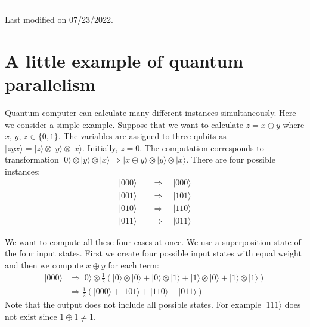 \documentclass[letterpaper,10pt,english]{jupyterBook}
\begin{document}
\bigskip\hrule\bigskip


\sphinxAtStartPar
Last modified on 07/23/2022.

\sphinxstepscope


\section{A little example of quantum parallelism}
\label{\detokenize{algorithms/qparallel:a-little-example-of-quantum-parallelism}}\label{\detokenize{algorithms/qparallel:sec-qparallel}}\label{\detokenize{algorithms/qparallel::doc}}
\sphinxAtStartPar
Quantum computer can calculate many different instances simultaneously. Here we consider a simple example.  Suppose that we want to calculate \(z = x \oplus y\) where \(x,\, y,\, z \in \{0,1\}\).  The variables are assigned to three qubits as \(|zyx\rangle = |z\rangle \otimes |y\rangle \otimes |x\rangle\).  Initially, \(z=0\).  The computation corresponds to transformation \(|0\rangle \otimes |y\rangle \otimes |x\rangle \Rightarrow |x \oplus y\rangle \otimes |y\rangle \otimes |x\rangle\).  There are four possible instances:
\begin{align}
|000\rangle \quad &\Rightarrow \quad |000\rangle \\
|001\rangle \quad &\Rightarrow \quad |101\rangle \\
|010\rangle \quad &\Rightarrow \quad |110\rangle \\
|011\rangle \quad &\Rightarrow \quad |011\rangle
\end{align}

\sphinxAtStartPar
We want to compute all these four cases at once.  We use a superposition state of the four input states. First we create four possible input states with equal weight and then we compute \(x\oplus y\) for each term:
\begin{align}
|000\rangle &\Rightarrow |0\rangle \otimes \frac{1}{2}\left(|0\rangle\otimes|0\rangle+|0\rangle\otimes|1\rangle+|1\rangle\otimes|0\rangle + |1\rangle\otimes|1\rangle \right) \\
&\Rightarrow \frac{1}{2}\left(|000\rangle + |101\rangle + |110\rangle + |011\rangle \right)
\end{align}
\sphinxAtStartPar
Note that the output does not include all possible states.  For example \(|111\rangle\) does not exist since \(1\oplus 1 \ne 1\).
\end{document}
